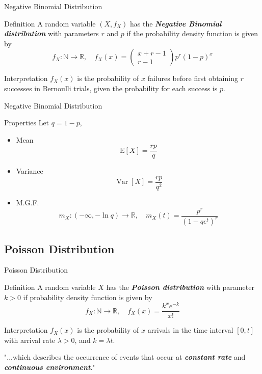 \documentclass{beamer}
\newcommand{\bb}[1]{\textcolor{antiquefuchsia}{\textbf{\textit{#1}}}}
\begin{document}
\begin{frame}{Negative Binomial Distribution}
\begin{block}{Definition}
A random variable $\left(X, f_{X}\right)$ has the \bb{Negative Binomial distribution} with parameters $r$ and $p$ if the probability density function is given by
$$
f_{X}: \mathbb{N} \rightarrow \mathbb{R}, \quad f_{X}(x)=\left(\begin{array}{c}
x+r-1 \\
r-1
\end{array}\right) p^{r}(1-p)^{x}
$$
\end{block}
\begin{block}{Interpretation}
$f_{X}(x)$ is the probability of $x$ failures before first obtaining $r$ successes in Bernoulli trials, given the probability for each success is $p$.
\end{block}
\end{frame}

\begin{frame}{Negative Binomial Distribution}
\begin{block}{Properties}
Let $q=1-p$,
\begin{itemize}
\item Mean
$$
\mathrm{E}[X]=\frac{r p}{q}
$$
\item Variance
$$
\operatorname{Var}[X]=\frac{r p}{q^{2}}
$$
\item M.G.F.
$$
m_{X}:(-\infty,-\ln q) \rightarrow \mathbb{R}, \quad m_{X}(t)=\frac{p^{r}}{\left(1-q e^{t}\right)^{r}}
$$
\end{itemize}
\end{block}
\end{frame}

\subsection{Poisson Distribution}
\begin{frame}{Poisson Distribution}
\begin{block}{Definition}
A random variable $X$ has the \bb{Poisson distribution} with parameter $k>0$ if probability density function is given by
$$
f_{X}: \mathbb{N} \rightarrow \mathbb{R}, \quad f_{X}(x)=\frac{k^{x} e^{-k}}{x !}
$$
\end{block}
\begin{block}{Interpretation}
$f_{X}(x)$ is the probability of $x$ arrivals in the time interval $[0, t]$ with arrival rate $\lambda>0$, and $k=\lambda t$.

"...which describes the occurrence of events that occur at \bb{constant rate} and \bb{continuous environment}."
\end{block}
\end{frame}
\end{document}
